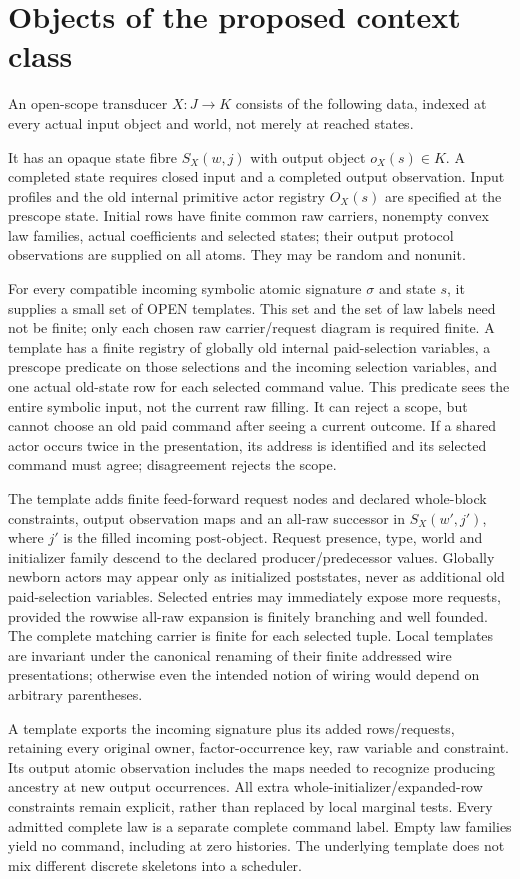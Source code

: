 \documentclass[11pt]{article}\usepackage{amsmath,amssymb,amsthm,geometry}\geometry{margin=1in}
\begin{document}
\section{Objects of the proposed context class}
An open-scope transducer $X:J\to K$ consists of the following data, indexed at every actual input object and world, not merely at reached states.

It has an opaque state fibre $S_X(w,j)$ with output object $o_X(s)\in K$. A completed state requires closed input and a completed output observation. Input profiles and the old internal primitive actor registry $O_X(s)$ are specified at the prescope state. Initial rows have finite common raw carriers, nonempty convex law families, actual coefficients and selected states; their output protocol observations are supplied on all atoms. They may be random and nonunit.

For every compatible incoming symbolic atomic signature $\sigma$ and state $s$, it supplies a small set of OPEN templates. This set and the set of law labels need not be finite; only each chosen raw carrier/request diagram is required finite. A template has a finite registry of globally old internal paid-selection variables, a prescope predicate on those selections and the incoming selection variables, and one actual old-state row for each selected command value. This predicate sees the entire symbolic input, not the current raw filling. It can reject a scope, but cannot choose an old paid command after seeing a current outcome. If a shared actor occurs twice in the presentation, its address is identified and its selected command must agree; disagreement rejects the scope.

The template adds finite feed-forward request nodes and declared whole-block constraints, output observation maps and an all-raw successor in $S_X(w',j')$, where $j'$ is the filled incoming post-object. Request presence, type, world and initializer family descend to the declared producer/predecessor values. Globally newborn actors may appear only as initialized poststates, never as additional old paid-selection variables. Selected entries may immediately expose more requests, provided the rowwise all-raw expansion is finitely branching and well founded. The complete matching carrier is finite for each selected tuple. Local templates are invariant under the canonical renaming of their finite addressed wire presentations; otherwise even the intended notion of wiring would depend on arbitrary parentheses.

A template exports the incoming signature plus its added rows/requests, retaining every original owner, factor-occurrence key, raw variable and constraint. Its output atomic observation includes the maps needed to recognize producing ancestry at new output occurrences. All extra whole-initializer/expanded-row constraints remain explicit, rather than replaced by local marginal tests. Every admitted complete law is a separate complete command label. Empty law families yield no command, including at zero histories. The underlying template does not mix different discrete skeletons into a scheduler.
\end{document}
